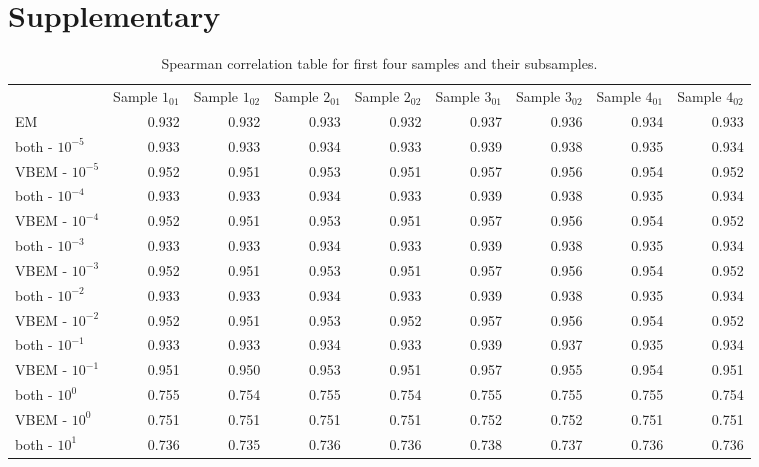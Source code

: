 \section{Supplementary}
\begin{table}[t]
  \caption{Spearman correlation table for first four samples and their subsamples.}
  \label{speartable}
  \tabcolsep=0pt%
  \begin{tabular*}{\textwidth}{@{\extracolsep{\fill}}lrrrrrrrr@{\extracolsep{\fill}}}
  \toprule%
  \textbf{} &
  \multicolumn{1}{l}{Sample $1_{01}$} &
  \multicolumn{1}{l}{Sample $1_{02}$} &
  \multicolumn{1}{l}{Sample $2_{01}$} &
  \multicolumn{1}{l}{Sample $2_{02}$} &
  \multicolumn{1}{l}{Sample $3_{01}$} &
  \multicolumn{1}{l}{Sample $3_{02}$} &
  \multicolumn{1}{l}{Sample $4_{01}$} &
  \multicolumn{1}{l}{Sample $4_{02}$} \\
EM           & 0.932 & 0.932 & 0.933 & 0.932 & 0.937 & 0.936 & 0.934 & 0.933 \\
both - $10^{-5}$ & 0.933 & 0.933 & 0.934 & 0.933 & 0.939 & 0.938 & 0.935 & 0.934 \\
VBEM - $10^{-5}$ & 0.952 & 0.951 & 0.953 & 0.951 & 0.957 & 0.956 & 0.954 & 0.952 \\
both - $10^{-4}$ & 0.933 & 0.933 & 0.934 & 0.933 & 0.939 & 0.938 & 0.935 & 0.934 \\
VBEM - $10^{-4}$ & 0.952 & 0.951 & 0.953 & 0.951 & 0.957 & 0.956 & 0.954 & 0.952 \\
both - $10^{-3}$ & 0.933 & 0.933 & 0.934 & 0.933 & 0.939 & 0.938 & 0.935 & 0.934 \\
VBEM - $10^{-3}$ & 0.952 & 0.951 & 0.953 & 0.951 & 0.957 & 0.956 & 0.954 & 0.952 \\
both - $10^{-2}$ & 0.933 & 0.933 & 0.934 & 0.933 & 0.939 & 0.938 & 0.935 & 0.934 \\
VBEM - $10^{-2}$ & 0.952 & 0.951 & 0.953 & 0.952 & 0.957 & 0.956 & 0.954 & 0.952 \\
both - $10^{-1}$ & 0.933 & 0.933 & 0.934 & 0.933 & 0.939 & 0.937 & 0.935 & 0.934 \\
VBEM - $10^{-1}$ & 0.951 & 0.950 & 0.953 & 0.951 & 0.957 & 0.955 & 0.954 & 0.951 \\
both - $10^{0}$  & 0.755 & 0.754 & 0.755 & 0.754 & 0.755 & 0.755 & 0.755 & 0.754 \\
VBEM - $10^{0}$  & 0.751 & 0.751 & 0.751 & 0.751 & 0.752 & 0.752 & 0.751 & 0.751 \\
both - $10^{1}$  & 0.736 & 0.735 & 0.736 & 0.736 & 0.738 & 0.737 & 0.736 & 0.736 \\

\end{tabular*}
\end{table}
